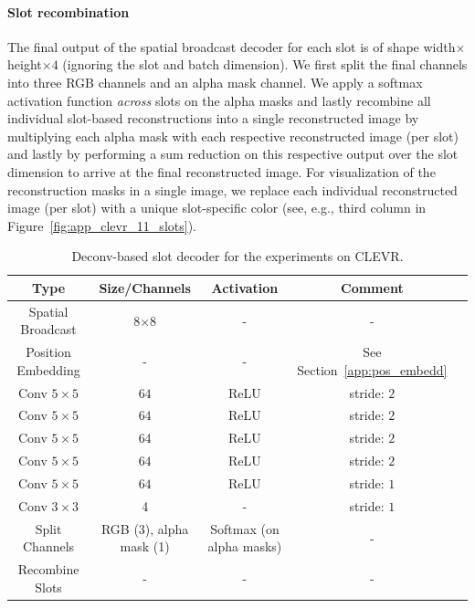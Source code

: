 \documentclass{article}
\begin{document}
\paragraph{Slot recombination}
The final output of the spatial broadcast decoder for each slot is of shape width$\times$height$\times4$ (ignoring the slot and batch dimension). We first split the final channels into three RGB channels and an alpha mask channel. We apply a softmax activation function \textit{across} slots on the alpha masks and lastly recombine all individual slot-based reconstructions into a single reconstructed image by multiplying each alpha mask with each respective reconstructed image (per slot) and lastly by performing a sum reduction on this respective output over the slot dimension to arrive at the final reconstructed image. For visualization of the reconstruction masks in a single image, we replace each individual reconstructed image (per slot) with a unique slot-specific color (see, e.g., third column in Figure~\ref{fig:app_clevr_11_slots}).

\begin{table}[htp!]
\centering
\caption{Deconv-based slot decoder for the experiments on CLEVR.}
\begin{tabular}{ccccc}
\toprule
Type & Size/Channels & Activation & Comment \\
\midrule
Spatial Broadcast & 8$\times$8 & - &  - \\
Position Embedding & - & - &  See Section~\ref{app:pos_embedd} \\
Conv $5\times 5$ & $64$ & ReLU & stride: $2$\\
Conv $5\times 5$ & $64$ & ReLU & stride: $2$\\
Conv $5\times 5$ & $64$ & ReLU & stride: $2$\\
Conv $5\times 5$ & $64$ & ReLU & stride: $2$\\
Conv $5\times 5$ & $64$ & ReLU & stride: $1$\\
Conv $3\times 3$ & 4 & - & stride: $1$\\
Split Channels & RGB (3), alpha mask (1) & Softmax (on alpha masks) & - \\
Recombine Slots & - & - & - \\
\bottomrule
\end{tabular}
\label{table:architecture_cnn_dec_clevr}
\end{table}
\end{document}
